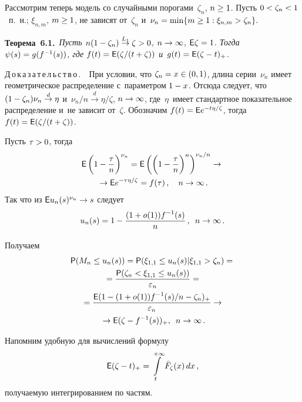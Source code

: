 \begin{multicols}{2}
Рассмотрим теперь модель со случайными порогами~$\zeta_n$, $n\hm\ge 1$.
Пусть $0\hm<\zeta_n\hm<1$~п.~н.; $\xi_{n,m}$, $m\hm\ge 1$, не зависят от~$\zeta_n$
и~$\nu_n\hm=\min\{m\ge 1: \xi_{n,m}>\zeta_n\}.$

\smallskip

\noindent
\textbf{Теорема~6.1.}\ \textit{Пусть $n(1-\zeta_n)\stackrel{L_1}{\to}\zeta\hm>0$,
$n\hm\to\infty$, ${\sf E}\zeta\hm=1$.
Тогда $\psi(s)\hm=g(f^{-1}(s))$, где
$f(t)\hm={\sf E}(\zeta/(t+\zeta))$ и~$g(t)\hm={\sf E}(\zeta-t)_+$.}


\noindent
Д\,о\,к\,а\,з\,а\,т\,е\,л\,ь\,с\,т\,в\,о\,.\ \
 При условии, что $\zeta_n\hm=x\in (0,1)$, длина серии~$\nu_n$
 имеет геометрическое распределение с~параметром $1\hm-x$. Отсюда следует,
 что $(1\hm-\zeta_n)\nu_n\stackrel{d}{\to}\eta$
 и~$\nu_n/n\stackrel{d}{\to}\eta/\zeta$, $n\hm\to\infty$, где~$\eta$~имеет
 стандартное показательное
распределение и~не зависит от~$\zeta$. Обозначим $f(t)\hm={\sf E}e^{-t\eta/\zeta}$,
тогда $f(t)\hm={\sf E}(\zeta/(t+\zeta))$.

Пусть $\tau\hm>0$, тогда
\begin{multline*}
{\sf E}\left(1-\displaystyle\frac{\displaystyle \tau\mathstrut}{\displaystyle n\mathstrut}\right)^{\nu_n}={\sf E}
\left(\left(1-\displaystyle\frac{\displaystyle \tau\mathstrut}{\displaystyle n\mathstrut}\right)^n\right)^{\nu_n/n}\to{}\\
{}\to
{\sf E}e^{-\tau\eta/\zeta}=f(\tau)\,,\quad n\to\infty\,.
\end{multline*}
Так что из ${\sf E}u_n(s)^{\nu_n}\hm\to s $ следует
$$
u_n(s)=1-\displaystyle\frac{\displaystyle (1+o(1))f^{-1}(s)\mathstrut}{\displaystyle n\mathstrut}\,,\enskip n\to\infty\,.
$$

Получаем
\begin{multline*}
{\sf P}(M_n\le u_n(s))={\sf P}(\xi_{1,1}\le u_n(s)|\xi_{1,1}>\zeta_n)={}\\
{}=\displaystyle\frac{\displaystyle {\sf P}(\zeta_n<\xi_{1,1}\le u_n(s))\mathstrut}{\displaystyle \varepsilon_n\mathstrut}={}\\
{}=\displaystyle\frac{\displaystyle {\sf E}(1-(1+o(1))f^{-1}(s)/n-\zeta_n)_+\mathstrut}{\displaystyle \varepsilon_n\mathstrut}\to{}\\
{}\to {\sf E}(\zeta-f^{-1}(s))_+,\enskip n\to\infty\,.
\end{multline*}


Напомним удобную для вычислений формулу
\begin{equation}
\label{forepl}
{\sf E}(\zeta-t)_+=\int\limits_t^{+\infty}{\bar F}_\zeta(x)\,dx\,,
\end{equation}
получаемую интегрированием по частям.

\smallskip


\end{multicols}
